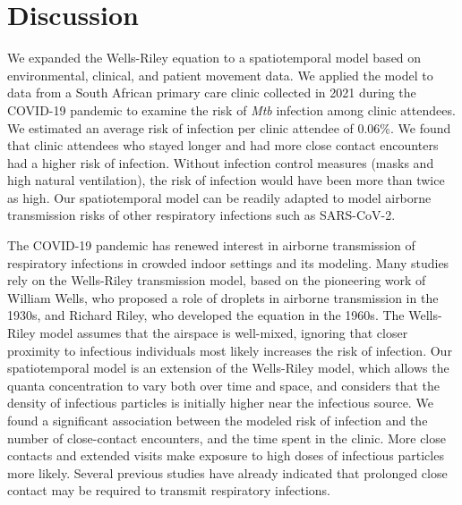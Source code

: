 \documentclass[fleqn,11pt]{wlscirep}
\begin{document}
\FloatBarrier

\newpage

\section*{Discussion}

We expanded the Wells-Riley equation to a spatiotemporal model based on environmental, clinical, and patient movement data. We applied the model to data from a South African primary care clinic collected in 2021 during the COVID-19 pandemic to examine the risk of \emph{Mtb} infection among clinic attendees. We estimated an average risk of infection per clinic attendee of 0.06\%. We found that clinic attendees who stayed longer and had more close contact encounters had a higher risk of infection. Without infection control measures (masks and high natural ventilation), the risk of infection would have been more than twice as high. Our spatiotemporal model can be readily adapted to model airborne transmission risks of other respiratory infections such as SARS-CoV-2.

The COVID-19 pandemic has renewed interest in airborne transmission of respiratory infections in crowded indoor settings\cite{Wang2021Science,Morawska2021,Greenhalgh2022BMJ} and its modeling\cite{Shen2021STBE,Buonanno2020EI,Edwards2024RiskAnalysis}. Many studies\cite{Andrews2014JID,Taylor2016IJTLD,Hella2017JInfect,Zemouri2020JDR} rely on the Wells-Riley transmission model\cite{Riley1961Book}, based on the pioneering work of William Wells, who proposed a role of droplets in airborne transmission in the 1930s\cite{Wells1934AJE}, and Richard Riley, who developed the equation in the 1960s\cite{Riley1961Book}.  The Wells-Riley model assumes that the airspace is well-mixed, ignoring that closer proximity to infectious individuals most likely increases the risk of infection. Our spatiotemporal model is an extension of the Wells-Riley model, which allows the quanta concentration to vary both over time and space, and considers that the density of infectious particles is initially higher near the infectious source\cite{Wang2021Science,Vuorinen2020SafSci,Chen2020BuildEnv}. We found a significant association between the modeled risk of infection and the number of close-contact encounters, and the time spent in the clinic. More close contacts and extended visits make exposure to high doses of infectious particles more likely. Several previous studies have already indicated that prolonged close contact may be required to transmit respiratory infections\cite{Leung2020NatMed,Brankston2007LancetID,Narasimhan2013PulmonaryMed}. 
\end{document}
